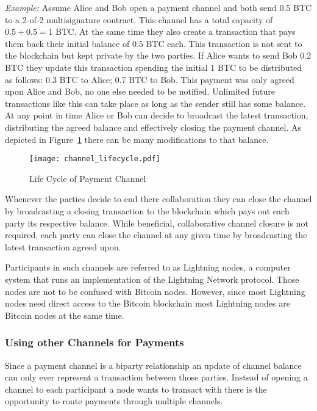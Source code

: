 \documentclass[final]{fhnwreport}       %
\begin{document}
\textit{Example:} Assume Alice and Bob open a payment channel and both send 0.5 BTC to a 2-of-2 multisignature contract. This channel has a total capacity of $0.5 + 0.5 = 1$ BTC. At the same time they also create a transaction that pays them back their initial balance of 0.5 BTC each. This transaction is not sent to the \gls{blockchain} but kept private by the two parties. If Alice wants to send Bob 0.2 BTC they update this transaction spending the initial 1 BTC to be distributed as follows: 0.3 BTC to Alice; 0.7 BTC to Bob. This payment was only agreed upon Alice and Bob, no one else needed to be notified. Unlimited future transactions like this can take place as long as the sender still has some balance. At any point in time Alice or Bob can decide to broadcast the latest transaction, distributing the agreed balance and effectively closing the payment channel. As depicted in Figure~\ref{fig:ChannelCycle} there can be many modifications to that balance.

\begin{figure}[H]
\centering
\texttt{[image: channel\_lifecycle.pdf]}
\caption{Life Cycle of Payment Channel}
\label{fig:ChannelCycle}
\end{figure}

Whenever the parties decide to end there collaboration they can close the channel by broadcasting a closing transaction to the \gls{blockchain} which pays out each party its respective balance. While beneficial, collaborative channel closure is not required, each party can close the channel at any given time by broadcasting the latest transaction agreed upon. 

Participants in such channels are referred to as Lightning nodes, a computer system that runs an implementation of the Lightning Network protocol. Those nodes are not to be confused with Bitcoin nodes. However, since most Lightning nodes need direct access to the Bitcoin \gls{blockchain} most Lightning nodes are Bitcoin nodes at the same time.

\subsubsection{Using other Channels for Payments}
Since a payment channel is a biparty relationship an update of channel balance can only ever represent a transaction between those parties. Instead of opening a channel to each participant a node wants to transact with there is the opportunity to route payments through multiple channels.
\end{document}
